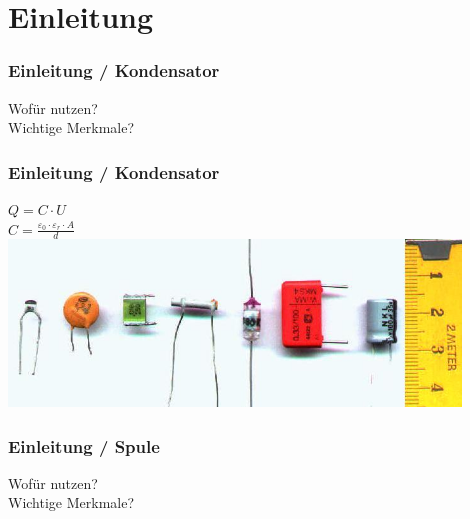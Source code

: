 

\subtitle{Technik Klasse A 03: \\
          Kondensator , Spule, Transformator \\[2em]}
\date{Stand 20.04.2015}


\section*{Einleitung}

\begin{frame}
    \frametitle{Einleitung / Kondensator}
    \begin{center}
        \Large{Wofür nutzen?}\\
        \Large{Wichtige Merkmale?}         
    \end{center}
\end{frame}

\begin{frame}
    \frametitle{Einleitung / Kondensator}
    \begin{center}
		\huge{$Q = C \cdot U$}\\
		\huge{$C= \frac{\varepsilon_{0} \cdot \varepsilon_{r} \cdot A}{d}$}\\
        \includegraphics[width=0.9\textwidth]{e05/Kondensator02.jpg}
        \tiny \hyperlink{refs}{\cite{wc}}
    \end{center}
\end{frame}


\begin{frame}
    \frametitle{Einleitung / Spule}
    \begin{center}
        \Large{Wofür nutzen?}\\
        \Large{Wichtige Merkmale?}         
    \end{center}
\end{frame}

